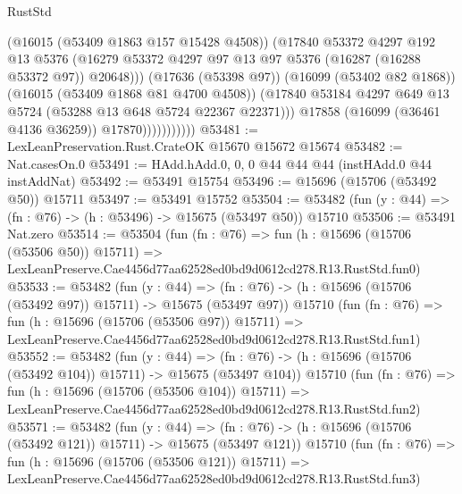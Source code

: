 \begin{lexlean}{RustStd}
\begin{coremodule}
                              (@16015 (@53409 @1863 @157 @15428 @4508))
                              (@17840
                                @53372
                                @4297
                                @192
                                @13
                                @5376
                                (@16279
                                  @53372
                                  @4297
                                  @97
                                  @13
                                  @97
                                  @5376
                                  (@16287 (@16288 @53372 @97))
                                  @20648)))
                            (@17636 (@53398 @97))
                            (@16099 (@53402 @82 @1868))
                            (@16015 (@53409 @1868 @81 @4700 @4508))
                            (@17840
                              @53184
                              @4297
                              @649
                              @13
                              @5724
                              (@53288 @13 @648 @5724 @22367 @22371)))
                          @17858
                          (@16099 (@36461 @4136 @36259))
                          @17870)))))))))))
@53481 := LexLeanPreservation.Rust.CrateOK @15670 @15672 @15674
@53482 := Nat.casesOn.{0}
@53491 := HAdd.hAdd.{0, 0, 0} @44 @44 @44 (instHAdd.{0} @44 instAddNat)
@53492 := @53491 @15754
@53496 := @15696 (@15706 (@53492 @50)) @15711
@53497 := @53491 @15752
@53504 := @53482 (fun (y : @44) => (fn : @76) -> (h : @53496) -> @15675 (@53497 @50)) @15710
@53506 := @53491 Nat.zero
@53514 := @53504
    (fun (fn : @76) =>
    fun (h : @15696 (@15706 (@53506 @50)) @15711) =>
    LexLeanPreserve.Cae4456d77aa62528ed0bd9d0612cd278.R13.RustStd.fun0)
@53533 := @53482
    (fun (y : @44) =>
    (fn : @76) -> (h : @15696 (@15706 (@53492 @97)) @15711) -> @15675 (@53497 @97))
    @15710
    (fun (fn : @76) =>
    fun (h : @15696 (@15706 (@53506 @97)) @15711) =>
    LexLeanPreserve.Cae4456d77aa62528ed0bd9d0612cd278.R13.RustStd.fun1)
@53552 := @53482
    (fun (y : @44) =>
    (fn : @76) -> (h : @15696 (@15706 (@53492 @104)) @15711) -> @15675 (@53497 @104))
    @15710
    (fun (fn : @76) =>
    fun (h : @15696 (@15706 (@53506 @104)) @15711) =>
    LexLeanPreserve.Cae4456d77aa62528ed0bd9d0612cd278.R13.RustStd.fun2)
@53571 := @53482
    (fun (y : @44) =>
    (fn : @76) -> (h : @15696 (@15706 (@53492 @121)) @15711) -> @15675 (@53497 @121))
    @15710
    (fun (fn : @76) =>
    fun (h : @15696 (@15706 (@53506 @121)) @15711) =>
    LexLeanPreserve.Cae4456d77aa62528ed0bd9d0612cd278.R13.RustStd.fun3)

\end{coremodule}
\end{lexlean}
